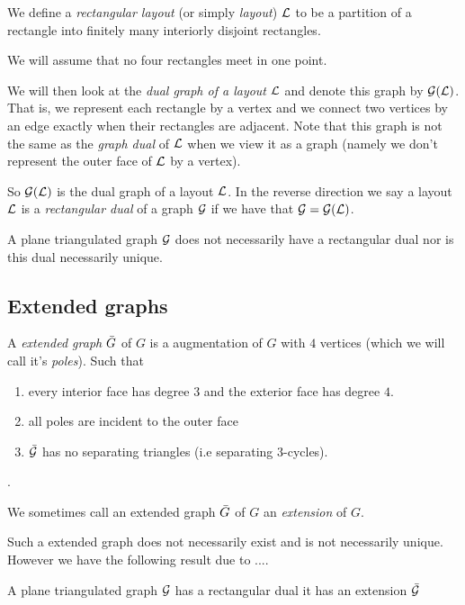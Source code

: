 We define a \emph{rectangular layout} (or simply \emph{layout}) $\mathcal{L}$ to be a partition of a rectangle into finitely many interiorly disjoint rectangles. 

We will assume that no four rectangles meet in one point.

We will then look at the \emph{dual graph of a layout} $\mathcal{L}$ and denote this graph by $\mathcal{G}(\mathcal{L})$. That is, we represent each rectangle by a vertex and we connect two vertices by an edge exactly when their rectangles are adjacent. Note that this graph is not the same as the \emph{graph dual} of $\mathcal{L}$ when we view it as a graph (namely we don't represent the outer face of $\mathcal{L}$ by a vertex).

So $\mathcal{G}(\mathcal{L})$ is the dual graph of a layout $\mathcal{L}$. In the reverse direction we say a layout $\mathcal{L}$ is a \emph{rectangular dual} of a graph $\mathcal{G}$ if we have that $\mathcal{G} = \mathcal{G} (\mathcal{L})$.

A plane triangulated graph $\mathcal{G}$ does not necessarily have a rectangular dual nor is this dual necessarily unique.


\subsection{Extended graphs}
A \emph{extended graph} $\bar{G}$ of $G$ is a augmentation of $G$ with $4$  vertices (which we will call it's \emph{poles}). Such that 
\begin{enumerate}
\item every interior face has degree $3$ and the exterior face has degree $4$.
\item all poles are incident to the outer face
\item $\bar{\mathcal{G}}$ has no separating triangles (i.e separating $3$-cycles).
\end{enumerate}.

We sometimes call an extended graph $\bar{G}$ of $G$ an \emph{extension} of $G$.

Such a extended graph does not necessarily exist and is not necessarily unique.  %
However we have the following result due to .... %

\begin{thrm}
A plane triangulated graph $\mathcal{G}$ has a rectangular dual \ifftext it has an extension $\bar{\mathcal{G}}$
\end{thrm}

